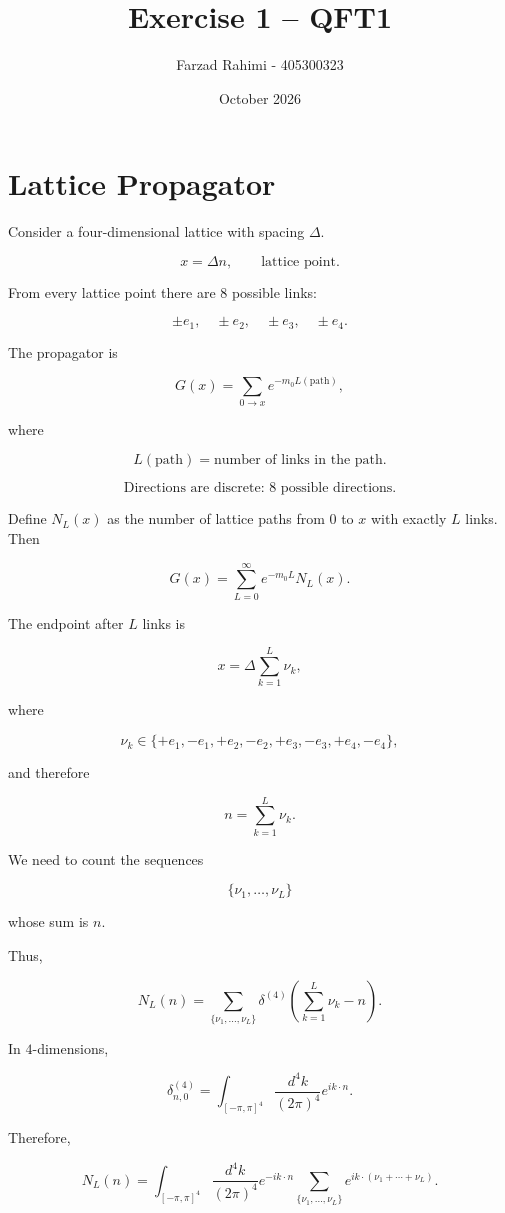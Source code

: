 \documentclass[12pt]{article}
\title{Exercise 1 -- QFT1}
\author{Farzad Rahimi - 405300323}
\date{October 2026}
\begin{document}
\maketitle

\section*{Lattice Propagator}

Consider a four-dimensional lattice with spacing $\Delta$.

\[
x=\Delta n,
\qquad
\text{lattice point}.
\]

From every lattice point there are $8$ possible links:

\[
\pm e_1,\quad
\pm e_2,\quad
\pm e_3,\quad
\pm e_4.
\]

The propagator is

\[
G(x)
=
\sum_{0\to x}
e^{-m_0 L(\text{path})},
\]

where

\[
L(\text{path})
=
\text{number of links in the path}.
\]

\[
\boxed{
\text{Directions are discrete: 8 possible directions.}
}
\]

Define $N_L(x)$ as the number of lattice paths from $0$ to $x$
with exactly $L$ links. Then

\[
G(x)
=
\sum_{L=0}^{\infty}
e^{-m_0L}N_L(x).
\]

The endpoint after $L$ links is

\[
x
=
\Delta\sum_{k=1}^{L}\nu_k,
\]

where

\[
\nu_k\in
\{
+e_1,-e_1,
+e_2,-e_2,
+e_3,-e_3,
+e_4,-e_4
\},
\]

and therefore

\[
n=\sum_{k=1}^{L}\nu_k.
\]

We need to count the sequences

\[
\{\nu_1,\ldots,\nu_L\}
\]

whose sum is $n$.

Thus,

\[
N_L(n)
=
\sum_{\{\nu_1,\ldots,\nu_L\}}
\delta^{(4)}
\left(
\sum_{k=1}^{L}\nu_k-n
\right).
\]

In $4$-dimensions,

\[
\delta^{(4)}_{n,0}
=
\int_{[-\pi,\pi]^4}
\frac{d^4k}{(2\pi)^4}
e^{ik\cdot n}.
\]

Therefore,

\[
N_L(n)
=
\int_{[-\pi,\pi]^4}
\frac{d^4k}{(2\pi)^4}
e^{-ik\cdot n}
\sum_{\{\nu_1,\ldots,\nu_L\}}
e^{ik\cdot(\nu_1+\cdots+\nu_L)}.
\]
\end{document}
